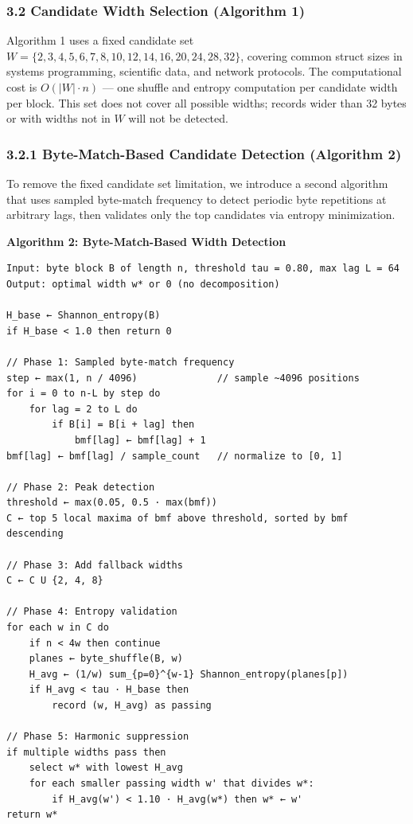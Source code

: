 \documentclass[
  11pt,
  letterpaper,
]{article}
\makeatletter
\renewcommand{\_}{\bpd@origunderscore\allowbreak}
\makeatother
\begin{document}
\hypertarget{candidate-width-selection-algorithm-1}{%
\subsubsection{3.2 Candidate Width Selection (Algorithm
1)}\label{candidate-width-selection-algorithm-1}}

Algorithm 1 uses a fixed candidate set
\(W = \{2, 3, 4, 5, 6, 7, 8, 10, 12, 14, 16, 20, 24, 28, 32\}\),
covering common struct sizes in systems programming, scientific data,
and network protocols. The computational cost is \(O(|W| \cdot n)\) ---
one shuffle and entropy computation per candidate width per block. This
set does not cover all possible widths; records wider than 32 bytes or
with widths not in \(W\) will not be detected.

\hypertarget{byte-match-based-candidate-detection-algorithm-2}{%
\subsubsection{3.2.1 Byte-Match-Based Candidate Detection (Algorithm
2)}\label{byte-match-based-candidate-detection-algorithm-2}}

To remove the fixed candidate set limitation, we introduce a second
algorithm that uses sampled byte-match frequency to detect periodic byte
repetitions at arbitrary lags, then validates only the top candidates
via entropy minimization.

\textbf{Algorithm 2: Byte-Match-Based Width Detection}

\begin{verbatim}
Input: byte block B of length n, threshold tau = 0.80, max lag L = 64
Output: optimal width w* or 0 (no decomposition)

H_base ← Shannon_entropy(B)
if H_base < 1.0 then return 0

// Phase 1: Sampled byte-match frequency
step ← max(1, n / 4096)              // sample ~4096 positions
for i = 0 to n-L by step do
    for lag = 2 to L do
        if B[i] = B[i + lag] then
            bmf[lag] ← bmf[lag] + 1
bmf[lag] ← bmf[lag] / sample_count   // normalize to [0, 1]

// Phase 2: Peak detection
threshold ← max(0.05, 0.5 · max(bmf))
C ← top 5 local maxima of bmf above threshold, sorted by bmf descending

// Phase 3: Add fallback widths
C ← C U {2, 4, 8}

// Phase 4: Entropy validation
for each w in C do
    if n < 4w then continue
    planes ← byte_shuffle(B, w)
    H_avg ← (1/w) sum_{p=0}^{w-1} Shannon_entropy(planes[p])
    if H_avg < tau · H_base then
        record (w, H_avg) as passing

// Phase 5: Harmonic suppression
if multiple widths pass then
    select w* with lowest H_avg
    for each smaller passing width w' that divides w*:
        if H_avg(w') < 1.10 · H_avg(w*) then w* ← w'
return w*
\end{verbatim}
\end{document}
